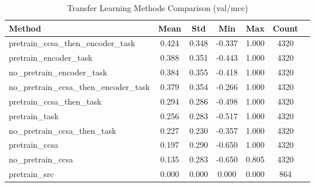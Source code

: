 \documentclass{article}
\begin{document}
\begin{table}[h!]
\centering
\caption{Transfer Learning Methods Comparison (val/mcc)}
\begin{tabular}{lcccccc}
\toprule
Method & Mean & Std & Min & Max & Count \\
\midrule
pretrain\_ccsa\_then\_encoder\_task & 0.424 & 0.348 & -0.337 & 1.000 & 4320 \\
pretrain\_encoder\_task & 0.388 & 0.351 & -0.443 & 1.000 & 4320 \\
no\_pretrain\_encoder\_task & 0.384 & 0.355 & -0.418 & 1.000 & 4320 \\
no\_pretrain\_ccsa\_then\_encoder\_task & 0.379 & 0.354 & -0.266 & 1.000 & 4320 \\
pretrain\_ccsa\_then\_task & 0.294 & 0.286 & -0.498 & 1.000 & 4320 \\
pretrain\_task & 0.256 & 0.283 & -0.517 & 1.000 & 4320 \\
no\_pretrain\_ccsa\_then\_task & 0.227 & 0.230 & -0.357 & 1.000 & 4320 \\
pretrain\_ccsa & 0.197 & 0.290 & -0.650 & 1.000 & 4320 \\
no\_pretrain\_ccsa & 0.135 & 0.283 & -0.650 & 0.805 & 4320 \\
pretrain\_src & 0.000 & 0.000 & 0.000 & 0.000 & 864 \\
\bottomrule
\end{tabular}
\label{tab:transfer_learning_methods_val_mcc}
\end{table}
\end{document}
